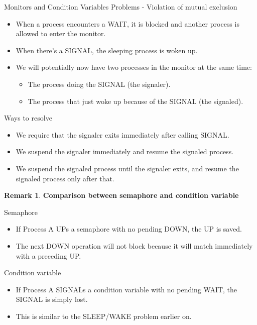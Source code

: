 \documentclass[12pt,a4paper]{article}
\theoremstyle{definition}
\newtheorem*{remark}{Remark}
\newenvironment{myitemize}
{ \begin{itemize}
    \setlength{\itemsep}{5pt}
    \setlength{\parskip}{0pt}
    \setlength{\parsep}{0pt}     }
{ \end{itemize}                  }
\begin{document}
	\textsf{Monitors and Condition Variables Problems} - Violation of mutual exclusion
	\begin{myitemize}
		\item When a process encounters a WAIT, it is blocked and another process is allowed to enter the monitor.
		\item When there’s a SIGNAL, the sleeping process is woken up.
		\item We will potentially now have two processes in the monitor at the same time:
		\begin{myitemize}
			\item The process doing the SIGNAL (the signaler).
			\item The process that just woke up because of the SIGNAL (the signaled).
		\end{myitemize}
	\end{myitemize}

	\textsf{Ways to resolve}
	\begin{myitemize}
		\item We require that the signaler exits immediately after calling SIGNAL.
		\item We suspend the signaler immediately and resume the signaled process.
		\item We suspend the signaled process until the signaler exits, and resume the signaled process only after that.
	\end{myitemize}
	
\begin{remark}{\textbf{Comparison between semaphore and condition variable}}


	\noindent \textsf{Semaphore}
	\begin{myitemize}
		\item If Process A UPs a semaphore with no pending DOWN, the UP is saved.
		\item The next DOWN operation will not block because it will match immediately with a preceding UP.
	\end{myitemize}
	\textsf{Condition variable}
	\begin{myitemize}
		\item If Process A SIGNALs a condition variable with no pending WAIT, the SIGNAL is simply lost.
		\item This is similar to the SLEEP/WAKE problem earlier on.
	\end{myitemize}
\end{remark}
\end{document}
